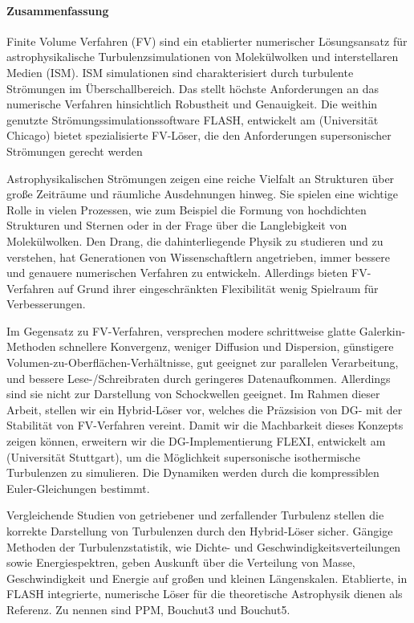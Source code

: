 \newpage
\paragraph{Zusammenfassung}
Finite Volume Verfahren (FV) sind ein etablierter numerischer Lösungsansatz für
astrophysikalische Turbulenzsimulationen von Molekülwolken und interstellaren
Medien (ISM). ISM simulationen sind charakterisiert durch turbulente Strömungen
im Überschallbereich. Das stellt höchste Anforderungen an das numerische
Verfahren hinsichtlich Robustheit und Genauigkeit. Die weithin genutzte
Strömungssimulationssoftware FLASH, entwickelt am  (Universität Chicago) bietet spezialisierte FV-Löser,
die den Anforderungen supersonischer Strömungen gerecht werden

Astrophysikalischen Strömungen zeigen eine reiche Vielfalt an Strukturen über
große Zeiträume und räumliche Ausdehnungen hinweg. Sie spielen eine wichtige
Rolle in vielen Prozessen, wie zum Beispiel die Formung von hochdichten
Strukturen und Sternen oder in der Frage über die Langlebigkeit von
Molekülwolken. Den Drang, die dahinterliegende Physik zu studieren und zu
verstehen, hat Generationen von Wissenschaftlern angetrieben, immer bessere und
genauere numerischen Verfahren zu entwickeln. Allerdings bieten FV-Verfahren
auf Grund ihrer eingeschränkten Flexibilität wenig Spielraum für Verbesserungen.

Im Gegensatz zu FV-Verfahren, versprechen modere schrittweise glatte
Galerkin-Methoden schnellere Konvergenz, weniger Diffusion und Dispersion,
günstigere Volumen-zu-Oberflächen-Verhältnisse, gut geeignet zur parallelen
Verarbeitung, und bessere Lese-/Schreibraten durch geringeres Datenaufkommen.
Allerdings sind sie nicht zur Darstellung von Schockwellen geeignet. Im Rahmen
dieser Arbeit, stellen wir ein Hybrid-Löser vor, welches die Präzsision von
DG- mit der Stabilität von FV-Verfahren vereint. Damit wir die Machbarkeit
dieses Konzepts zeigen können, erweitern wir die DG-Implementierung FLEXI,
entwickelt am  (Universität Stuttgart),
um die Möglichkeit supersonische isothermische Turbulenzen zu simulieren.
Die Dynamiken werden durch die kompressiblen Euler-Gleichungen bestimmt.

Vergleichende Studien von getriebener und zerfallender Turbulenz stellen die
korrekte Darstellung von Turbulenzen durch den Hybrid-Löser sicher.  Gängige
Methoden der Turbulenzstatistik, wie Dichte- und Geschwindigkeitsverteilungen
sowie Energiespektren, geben Auskunft über die Verteilung von Masse,
Geschwindigkeit und Energie auf großen und kleinen Längenskalen. Etablierte, in
FLASH integrierte, numerische Löser für die theoretische Astrophysik dienen als
Referenz. Zu nennen sind PPM, Bouchut3 und Bouchut5.
